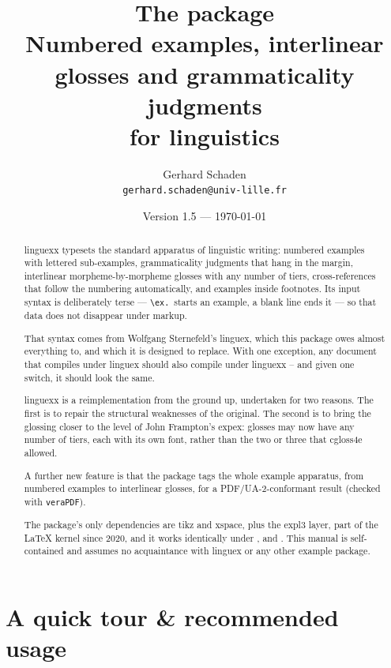 \documentclass[11pt,a4paper]{article}
\title{The \pkg{linguexx} package\\[4pt]
  \large Numbered examples, interlinear glosses and grammaticality
  judgments\\ for linguistics}
\author{Gerhard Schaden\\\texttt{gerhard.schaden@univ-lille.fr}}
\date{Version 1.5 --- \today}
\newcommand{\cs}[1]{\texttt{\textbackslash #1}}
\newcommand{\pkg}[2][]{\textsf{#2}}
\begin{document}
\maketitle

\begin{abstract}
\noindent
\pkg{linguexx} typesets the standard apparatus of linguistic writing:
numbered examples with lettered sub-examples, grammaticality judgments
that hang in the margin, interlinear morpheme-by-morpheme glosses with any
number of tiers, cross-references that follow the numbering automatically,
and examples inside footnotes. Its input syntax is deliberately terse ---
\cs{ex.}\ starts an example, a blank line ends it --- so that data does not
disappear under markup.

That syntax comes from Wolfgang Sternefeld's \pkg{linguex}, which this
package owes almost everything to, and which it is designed to
replace. With one exception, any document that compiles under \pkg{linguex} should also compile under \pkg{linguexx} – and given one switch, it should look the same.

\pkg{linguexx} is a reimplementation from the ground up,
undertaken for two reasons. The first is to repair the structural
weaknesses of the original. The second is to bring the glossing closer to the
level of John Frampton's \pkg{expex}: glosses may now have any number
of tiers, each with its own font, rather than the two or three that
\pkg{cgloss4e} allowed.

A further new feature is that the package tags the whole example
apparatus, from numbered examples to interlinear glosses, for a
PDF/UA-2-conformant result (checked with \texttt{veraPDF}).

The package's only dependencies are \pkg{tikz} and \pkg{xspace},
plus the \pkg{expl3} layer, part of the \LaTeX{} kernel since 2020,
and it works identically under ,  and
. This manual is self-contained and assumes no
acquaintance with \pkg{linguex} or any other example package.
\end{abstract}

\tableofcontents

\section{A quick tour \& recommended usage}\label{sec:tour}
\end{document}
